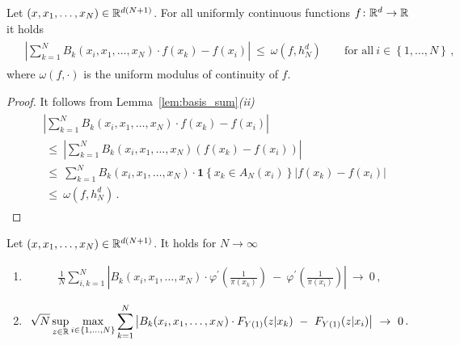 \begin{lemma}
  \label{lem:basis_approx_f}
  Let $(x,x_1,\ldots,x_N)\in\mathbb{R}^{d(N+1)}$.
  For all uniformly continuous functions $f\colon \mathbb{R}^d\to \mathbb{R}$ it holds
 \begin{align*}
   \begin{split}
   &
   \left|
  \sum_{k=1}^{N}
    B_k(x_i,x_1,\ldots,x_N)\cdot 
    f(x_k)
    -
    f(x_i)
   \right|
   \ 
   \le
   \ 
   \omega
   \left(
    f,h_N^d
   \right)
   \qquad
   \text{for all}\ 
   i\in \left\{ 1,\ldots,N \right\}
   \,,
   \end{split}
 \end{align*}
 where $\omega(f,\cdot)$ is the uniform modulus of continuity of $f$. 
\end{lemma}
\begin{proof}
  It follows from Lemma~\ref{lem:basis_sum}\textit{(ii)}
  \begin{align*}
   \begin{split}
   &
   \left|
  \sum_{k=1}^{N}
    B_k(x_i,x_1,\ldots,x_N)\cdot 
    f(x_k)
    -
    f(x_i)
   \right|
   \\
   &
   \ 
   \le
   \ 
   \left|
  \sum_{k=1}^{N}
    B_k(x_i,x_1,\ldots,x_N)
    \left(
    f(x_k)
    -
    f(x_i)
    \right)
   \right|
   \\
   &
   \ 
   \le
   \ 
  \sum_{k=1}^{N}
    B_k(x_i,x_1,\ldots,x_N)
    \cdot
    \mathbf{1}\left\{
      x_k\in A_N(x_i)
    \right\}
    \left|
    f(x_k)
    -
    f(x_i)
    \right|
   \\
   &
   \ 
   \le
   \ 
   \omega
   \left(
    f,h_N^d
   \right)
   \,.
   \end{split}
 \end{align*}
\end{proof}
\begin{lemma}
  Let $(x,x_1,\ldots,x_N)\in\mathbb{R}^{d(N+1)}$.
  It holds
  for $N\to\infty$
  \begin{enumerate}[label=(\roman*)]
      \item
      \begin{align*}
        \frac
        {1}
        {N}
        \sum_{i,k=1}^{N}
            \left|
        B_k(x_i,x_1,\ldots,x_N)
        \cdot
        \varphi^{'}
            \left(
              \frac
              {1}
              {\pi(x_k)}
            \right)
            \ 
            -
            \ 
            \varphi^{'}
            \left(
              \frac
              {1}
              {\pi(x_i)}
            \right)
            \right|
            \ 
            \to
            \ 
            0
            \,,
          \end{align*}
\item
      \begin{align*}
        \sqrt{N}
        \sup_{z\in\R}
        \max_{i\in \left\{ 1,\ldots,N \right\}}
        \sum_{k=1}^{N}
            \left|
        B_k(x_i,x_1,\ldots,x_N)
        \cdot
        F_{Y(1)}(z|x_k)
            \ 
            -
            \ 
        F_{Y(1)}(z|x_i)
            \right|
            \ 
            \to
            \ 
            0
            \,.
      \end{align*}
\end{enumerate}
\end{lemma}
